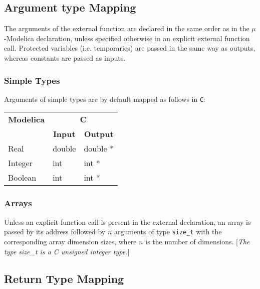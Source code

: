\documentclass[11pt,a4paper,notitlepage]{report}
\begin{document}
\subsection{Argument type Mapping}

The arguments of the external function are declared in the same order as in the $\mu$-Modelica declaration, unless specified otherwise in an explicit external function call. Protected variables (i.e. temporaries) are passed in the same way as outputs, whereas constants are passed as inputs.

\subsubsection{Simple Types}

\FloatBarrier

Arguments of simple types are by default mapped as follows in \verb"C":
\begin{table}[h]
\begin{small}
\begin{tabular}{|l|ll|}
\hline
\multicolumn{1}{|c|}{\textbf{Modelica}} &\multicolumn{2}{c|}{\textbf{C}}\\
\cline{2-3}
&\multicolumn{1}{c|}{\textbf{Input}} &\multicolumn{1}{c|}{\textbf{Output}}\\
\hline
\multicolumn{1}{|l|}{Real}&\multicolumn{1}{l|}{double} &\multicolumn{1}{l|}{double *}\\
\hline
\multicolumn{1}{|l|}{Integer}&\multicolumn{1}{l|}{int} &\multicolumn{1}{l|}{int *}\\
\hline
\multicolumn{1}{|l|}{Boolean}&\multicolumn{1}{l|}{int} &\multicolumn{1}{l|}{int *}\\
\hline
\end{tabular}
\end{small}
\end{table}

\subsubsection{Arrays}

Unless an explicit function call is present in the external declaration, an array is passed by its address followed by $n$ arguments of type \verb"size_t" with the corresponding array dimension sizes, where $n$ is the number of dimensions.
[\emph{The type size\_t is a C unsigned integer type.}]

\subsection{Return Type Mapping}
\end{document}
